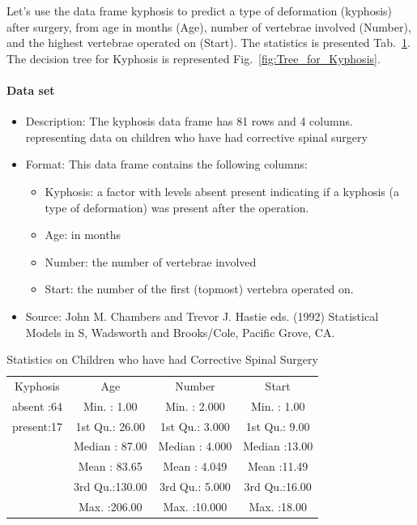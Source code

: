 \documentclass[final, paper=letter,5p,times,twocolumn]{elsarticle}
\begin{document}
Let's use the data frame kyphosis to predict a type of deformation (kyphosis) after surgery, from age in months (Age), number of vertebrae involved (Number), and the highest vertebrae operated on (Start). The statistics is presented Tab.~\ref{tab:Kyphosis}. The decision tree for Kyphosis is represented Fig.~\ref{fig:Tree_for_Kyphosis}.

\paragraph{Data set}{
  \begin{itemize}
  \item Description: The kyphosis data frame has 81 rows and 4 columns. representing data on children who have had corrective spinal surgery
  \item Format: This data frame contains the following columns:
    \begin{itemize}
    \item Kyphosis: a factor with levels absent present indicating if a kyphosis (a type of deformation) was present after the operation.
    \item Age: in months
    \item Number: the number of vertebrae involved
    \item Start: the number of the first (topmost) vertebra operated on.
    \end{itemize}
  \item Source: John M. Chambers and Trevor J. Hastie eds. (1992) Statistical Models in S, Wadsworth and Brooks/Cole, Pacific Grove, CA.
  \end{itemize}
}

\begin{table}[]
\begin{tabular}{cccc}
  Kyphosis   &    Age           &       Number    &       Start    \\
  absent :64 &  Min.   :  1.00  &  Min.   : 2.000 &  Min.   : 1.00  \\
  present:17 &  1st Qu.: 26.00  &  1st Qu.: 3.000 &  1st Qu.: 9.00  \\
             & Median : 87.00   &  Median : 4.000 &  Median :13.00  \\
             & Mean   : 83.65   &  Mean   : 4.049 &  Mean   :11.49  \\
             & 3rd Qu.:130.00   &  3rd Qu.: 5.000 &  3rd Qu.:16.00  \\
             & Max.   :206.00   &  Max.   :10.000 &  Max.   :18.00
\end{tabular}
\label{tab:Kyphosis}
\caption{Statistics on Children who have had Corrective Spinal Surgery}
\end{table}
\end{document}
